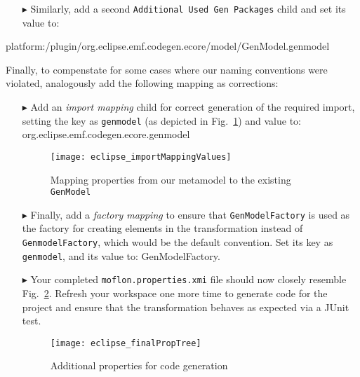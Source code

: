 \begin{enumerate}

\item[$\blacktriangleright$] Similarly, add a second \texttt{Additional Used Gen Packages} child and set its value to: \\
\end{enumerate}

\vspace{-1cm}
{\small \ttfamily platform:\-/\-plugin/\-org.\-eclipse.\-emf.\-codegen.\-ecore/\-model/\-GenModel.\-genmodel}

\newpage
Finally, to compenstate for some cases where our naming conventions were violated, analogously add the following mapping as corrections:

\begin{enumerate}
\item[$\blacktriangleright$] Add an \emph{import mapping} child for correct generation of the required import, setting the key as \texttt{genmodel} (as
depicted in Fig.~\ref{eclipse:impMapValues}) and value to: \\
{\small \ttfamily \hspace*{1.5cm} org.\-eclipse.\-emf.\-codegen.\-ecore.\-genmodel}

\vspace{0.5cm}

\begin{figure}[htbp]
\begin{centering}
\texttt{[image: eclipse\_importMappingValues]}
  \caption{Mapping properties from our metamodel to the existing \texttt{GenModel}}  
  \label{eclipse:impMapValues}
\end{centering}
\end{figure} 

\item [$\blacktriangleright$] Finally, add a \emph{factory mapping} to ensure that \texttt{GenModelFactory} is used as the factory for creating elements in the
transformation instead of \texttt{Genmodel\-Factory}, which would be the default convention. Set its key as \texttt{genmodel}, and its value to:
{\small \ttfamily GenModelFactory}.

\item [$\blacktriangleright$] Your completed \texttt{moflon.properties.xmi} file should now closely resemble Fig.~\ref{eclipse:finalPropTree}. Refresh your
workspace one more time to generate code for the project and ensure that the transformation behaves as expected via a JUnit test.

\newpage

\vspace*{2cm}

\begin{figure}[htbp]
\begin{centering}
\texttt{[image: eclipse\_finalPropTree]}
  \caption{Additional properties for code generation}  
  \label{eclipse:finalPropTree}
\end{centering}
\end{figure} 

\end{enumerate}

